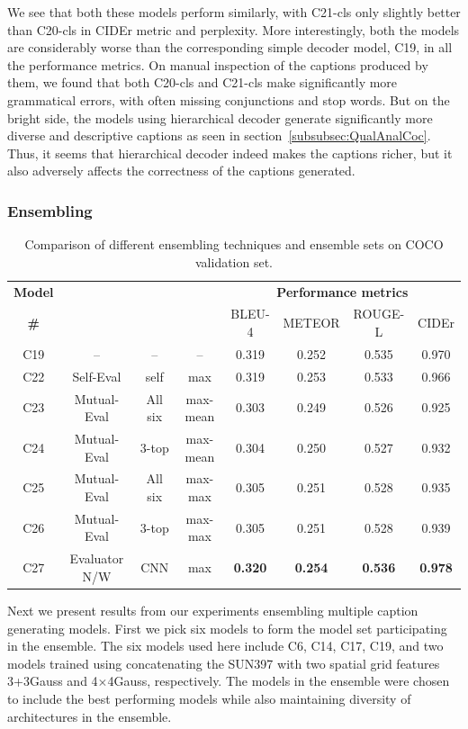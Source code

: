 We see that both these models perform similarly, with C21-cls only slightly
better than C20-cls in CIDEr metric and perplexity.
More interestingly, both the models are considerably worse than the
corresponding simple decoder model, C19, in all the performance metrics.
On manual inspection of the captions produced by them, we found that both
C20-cls and C21-cls make significantly more grammatical errors, with often
missing conjunctions and stop words.
But on the bright side, the models using hierarchical decoder generate
significantly more diverse and descriptive captions as seen in
section~\ref{subsubsec:QualAnalCoc}.
Thus, it seems that hierarchical decoder indeed makes the captions richer, but
it also adversely affects the correctness of the captions generated.

\subsubsection{Ensembling}
\begin{table}[htp]
  \centering
  \newcommand{\bs}{\small}
  \begin{adjustbox}{center}
  \begin{tabular}{|c|c|c|c|c|c|c|c|}
    \hline
    \bf Model & \bf \multirow{2}{*}{Method} & \bf \multirow{2}{*}{Evaluators}&
    \bf \multirow{2}{*}{Eval type}  & \multicolumn{4}{c|}{\bf Performance metrics}\\
    \cline{5-8}
    \bf \# & & & &\bs BLEU-4 &\bs METEOR &\bs ROUGE-L &\bs CIDEr\\\hline
    C19 & --    & -- & -- & 0.319 & 0.252 & 0.535 & 0.970\\\hline
    C22 & Self-Eval & self      & max      & 0.319 & 0.253 & 0.533 & 0.966\\\hline
    C23 & Mutual-Eval      &  All six  & max-mean & 0.303 & 0.249 & 0.526 & 0.925\\
    C24 & Mutual-Eval      &  3-top    & max-mean & 0.304 & 0.250 & 0.527 &
    0.932\\\cline{3-8}
    C25 & Mutual-Eval      &  All six  & max-max  & 0.305 & 0.251 & 0.528 & 0.935\\
    C26 & Mutual-Eval      &  3-top    & max-max  & 0.305 & 0.251 & 0.528 & 0.939\\\hline
    C27 & Evaluator N/W & CNN  & max&\bf0.320&\bf0.254 &\bf0.536 &\bf0.978\\\hline
  \end{tabular}
  \end{adjustbox}
  \caption{Comparison of different ensembling techniques and ensemble sets on COCO validation set.}
  \label{tab:resEnsembCocValset}
\end{table}
Next we present results from our experiments ensembling multiple caption
generating models.
First we pick six models to form the model set participating in the ensemble.
The six models used here include C6, C14, C17, C19, and two models trained
using concatenating the SUN397 with two spatial grid features 3+3Gauss and
4$\times$4Gauss, respectively.
The models in the ensemble were chosen to include the best performing models
while also maintaining diversity of architectures in the ensemble.

